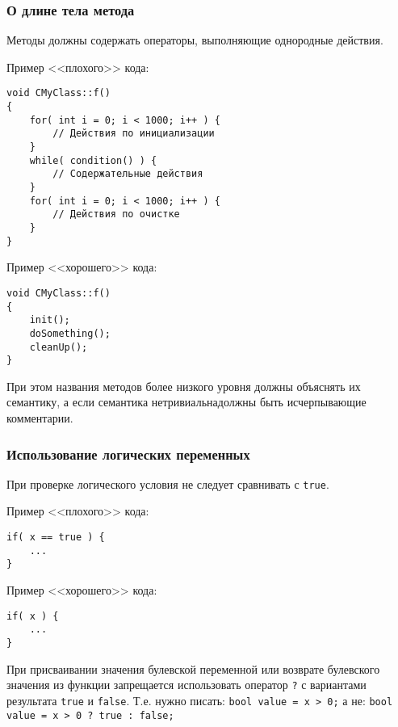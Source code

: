 {{{%
\newpage
\subsubsection{О длине тела метода}

Методы должны содержать операторы, выполняющие однородные действия.

Пример <<плохого>> кода:
\begin{lstlisting}[frame=single]
void CMyClass::f()
{
    for( int i = 0; i < 1000; i++ ) {
        // Действия по инициализации
    }
    while( condition() ) {
        // Содержательные действия
    }
    for( int i = 0; i < 1000; i++ ) {
        // Действия по очистке
    }
}
\end{lstlisting}

Пример <<хорошего>> кода:
\begin{lstlisting}[frame=single]
void CMyClass::f()
{
    init();
    doSomething();
    cleanUp();
}
\end{lstlisting}

При этом названия методов более низкого уровня должны объяснять их семантику, а если семантика нетривиальна\mdash  должны быть исчерпывающие комментарии. %

\subsubsection{Использование логических переменных}

При проверке логического условия не следует сравнивать с \lstinline|true|.

Пример <<плохого>> кода:
\begin{lstlisting}[frame=single]
if( x == true ) {
    ...
}
\end{lstlisting}

Пример <<хорошего>> кода:
\begin{lstlisting}[frame=single]
if( x ) {
    ...
}
\end{lstlisting}

При присваивании значения булевской переменной или возврате булевского значения из функции запрещается использовать оператор \lstinline|?| с вариантами результата \lstinline|true| и \lstinline|false|. Т.е. нужно писать: 
\newline \lstinline|bool value = x > 0;|
\newline а не: 
\newline \lstinline|bool value = x > 0 ? true : false;|

}}}
